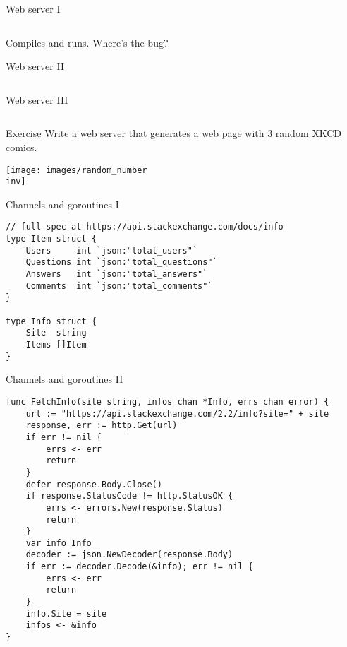 \documentclass[10pt]{beamer}
\newcommand{\inv}{-inv}
\begin{document}
	
	\begin{frame}[t,fragile]{Web server I}
		\inputminted{go}{code/11_server.go}
		\pause
		Compiles and runs. Where's the bug?
	\end{frame}
					
	
	\begin{frame}[fragile]{Web server II}
		\inputminted{go}{code/12_mutex.go}
	\end{frame}
						
	
	\begin{frame}[fragile]{Web server III}
		\inputminted{go}{code/13_atomic.go}
	\end{frame}
	
	
	\begin{frame}[fragile]{Exercise}
		Write a web server that generates a web page with 3 random XKCD comics.\\
		\begin{center}
			\texttt{[image: images/random\_number\\inv]}
		\end{center}
	\end{frame}
							
	
	\begin{frame}[fragile]{Channels and goroutines I}
		\begin{verbatim}
// full spec at https://api.stackexchange.com/docs/info
type Item struct {
	Users     int `json:"total_users"`
	Questions int `json:"total_questions"`
	Answers   int `json:"total_answers"`
	Comments  int `json:"total_comments"`
}

type Info struct {
	Site  string
	Items []Item
}
		\end{verbatim}
	\end{frame}
								
	
	\begin{frame}[fragile]{Channels and goroutines II}
		\begin{verbatim}
func FetchInfo(site string, infos chan *Info, errs chan error) {
	url := "https://api.stackexchange.com/2.2/info?site=" + site
	response, err := http.Get(url)
	if err != nil {
		errs <- err
		return
	}
	defer response.Body.Close()
	if response.StatusCode != http.StatusOK {
		errs <- errors.New(response.Status)
		return
	}
	var info Info
	decoder := json.NewDecoder(response.Body)
	if err := decoder.Decode(&info); err != nil {
		errs <- err
		return
	}
	info.Site = site
	infos <- &info
}
		\end{verbatim}
	\end{frame}
									
\end{document}
